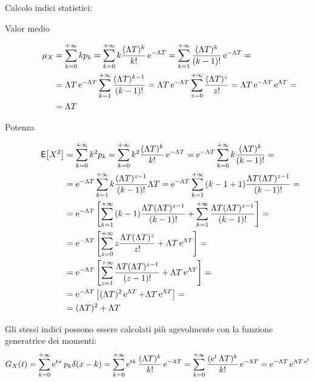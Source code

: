 Calcolo indici statistici:
\begin{description}
\item[Valor medio]
\begin{equation}\begin{split}\mu_X&=\sum_{k=0}^{+\infty}{k p_k}=\sum_{k=0}^{+\infty}{k \frac{(\Lambda T)^k}{k!}\operatorname{e}^{-\Lambda T}}=\sum_{k=1}^{+\infty}{\frac{(\Lambda T)^k}{(k-1)!}\operatorname{e}^{-\Lambda T}}=\\
&=\Lambda T \operatorname{e}^{-\Lambda T} \sum_{k=1}^{+\infty}{\frac{(\Lambda T)^{k-1}}{(k-1)!}}=\Lambda T \operatorname{e}^{-\Lambda T}\sum_{z=0}^{+\infty}{\frac{(\Lambda T)^z}{z!}}=\Lambda T \operatorname{e}^{-\Lambda T}\operatorname{e}^{\Lambda T}=\\
&=\Lambda T
\end{split}\end{equation}
\item[Potenza]
\begin{equation}\begin{split}
\,{\operatorname{\mathsf{E}}}\!\left[{X^2}\right]&=\sum_{k=0}^{+\infty}{k^2 p_k}=\sum_{k=0}^{+\infty}{k^2 \frac{(\Lambda T)^k}{k!}\operatorname{e}^{-\Lambda T}}=\operatorname{e}^{-\Lambda T}\sum_{k=0}^{+\infty}{k\frac{(\Lambda T)^k}{(k-1)!}}=\\
&=\operatorname{e}^{-\Lambda T}\sum_{k=1}^{+\infty}{k\frac{(\Lambda T)^{z-1}}{(k-1)!}\Lambda T}=
\operatorname{e}^{-\Lambda T}\sum_{k=1}^{+\infty}{(k-1+1)\frac{\Lambda T(\Lambda T)^{z-1}}{(k-1)!}}=\\
&=\operatorname{e}^{-\Lambda T}\left[\sum_{k=1}^{+\infty}{(k-1)\frac{\Lambda T(\Lambda T)^{z-1}}{(k-1)!}} + \sum_{k=1}^{+\infty}{\frac{\Lambda T(\Lambda T)^{z-1}}{(k-1)!}}\right]=\\
&=\operatorname{e}^{-\Lambda T}\left[\sum_{z=0}^{+\infty}{z\frac{\Lambda T(\Lambda T)^z}{z!}} + \Lambda T\operatorname{e}^{\Lambda T}\right]=\\
&=\operatorname{e}^{-\Lambda T}\left[\sum_{z=1}^{+\infty}{\frac{\Lambda T(\Lambda T)^{z-1}}{(z-1)!}} + \Lambda T\operatorname{e}^{\Lambda T}\right]=\\
&=\operatorname{e}^{-\Lambda T}\left[(\Lambda T)^2 \operatorname{e}^{\Lambda T} + \Lambda T\operatorname{e}^{\Lambda T}\right]=\\
&=(\Lambda T)^2 + \Lambda T
\end{split}\end{equation}
\end{description}

Gli stessi indici possono essere calcolati più agevolmente con la funzione generatrice dei momenti:
\begin{equation}G_X(t)=\sum_{k=0}^{+\infty}{\operatorname{e}^{t x}p_k\delta(x-k)}=\sum_{k=0}^{+\infty}{\operatorname{e}^{t k}\frac{(\Lambda T)^k}{k!}\operatorname{e}^{-\Lambda T}}=\sum_{k=0}^{+\infty}{\frac{(\operatorname{e}^{t}\Lambda T)^k}{k!}\operatorname{e}^{-\Lambda T}}=\operatorname{e}^{-\Lambda T}\operatorname{e}^{\Lambda T\operatorname{e}^{t}}\end{equation}

